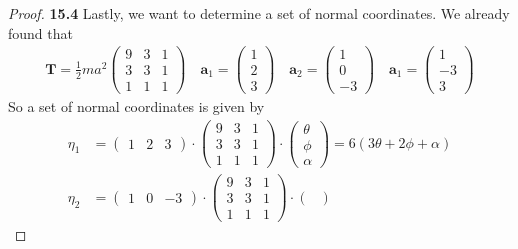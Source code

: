 \documentclass[11pt]{article}
\theoremstyle{definition}
\begin{document}
\begin{proof}{\textbf{15.4}}
    Lastly, we want to determine a set of normal coordinates.
    We already found that
    \begin{align*}
        \bm{T} = \frac{1}{2}ma^2\begin{pmatrix}
            9  & 3 & 1\\
            3 & 3 & 1\\
            1 & 1 & 1
        \end{pmatrix} \quad
        \bm{a}_1 = \begin{pmatrix}
            1 \\ 2 \\ 3
        \end{pmatrix}\quad
        \bm{a}_2 = \begin{pmatrix}
            1 \\ 0 \\ -3
        \end{pmatrix}\quad
        \bm{a}_1 = \begin{pmatrix}
            1 \\ -3 \\ 3
        \end{pmatrix}
    \end{align*}
    So a set of normal coordinates is given by
    \begin{align*}
        \eta_1 &= \begin{pmatrix}1 & 2 & 3\end{pmatrix}
        \cdot \begin{pmatrix}
            9  & 3 & 1\\
            3 & 3 & 1\\
            1 & 1 & 1
        \end{pmatrix}
        \cdot \begin{pmatrix}
            \theta \\ \phi \\ \alpha
        \end{pmatrix}
        = 6(3\theta + 2\phi + \alpha)\\
        \eta_2 &= \begin{pmatrix}1 & 0 & -3\end{pmatrix}
        \cdot \begin{pmatrix}
            9  & 3 & 1\\
            3 & 3 & 1\\
            1 & 1 & 1
        \end{pmatrix}
        \cdot \begin{pmatrix}

\end{pmatrix}
\end{align*}
\end{proof}
\end{document}
